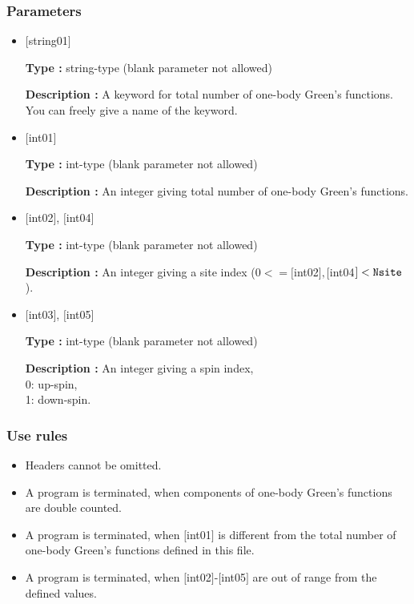 \subsubsection{Parameters}
 \begin{itemize}

    \item  $[$string01$]$
   
    {\bf Type :} string-type (blank parameter not allowed)

   {\bf Description :} A keyword for total number of one-body Green's functions. You can freely give a name of the keyword.

   \item  $[$int01$]$
   
    {\bf Type :} int-type (blank parameter not allowed)

   {\bf Description :}  An integer giving total number of one-body Green's functions.

  \item  $[$int02$]$, $[$int04$]$

 {\bf Type :} int-type (blank parameter not allowed)

{\bf Description :} An integer giving a site index ($0<= [$int02$], [$int04$]<\verb|Nsite|$).
 
  \item  $[$int03$]$, $[$int05$]$

 {\bf Type :} int-type (blank parameter not allowed)

{\bf Description :} 
An integer giving a spin index,\\
0: up-spin,\\
1: down-spin.

\end{itemize}

\subsubsection{Use rules}
\begin{itemize}
\item Headers cannot be omitted. 
\item A program is terminated, when components of one-body Green's functions are double counted.
\item A program is terminated, when $[$int01$]$ is different from the total number of one-body Green's functions defined in this file.
\item A program is terminated, when $[$int02$]$-$[$int05$]$ are out of range from the defined values.
\end{itemize}

